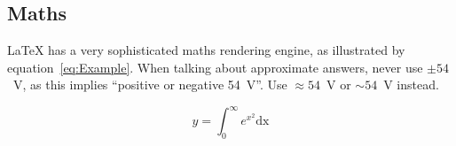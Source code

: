 \subsection{Maths}
\LaTeX{} has a very sophisticated maths rendering engine, as illustrated by equation~\ref{eq:Example}.  When talking about approximate answers, never use $\pm{54}$~V, as this implies ``positive or negative 54~V''.  Use $\approx{54}$~V or $\sim{54}$~V instead.

\begin{equation}
    y = \int_0^\infty e^{x^2} \mathrm{dx}
    \label{eq:Example}
\end{equation}



